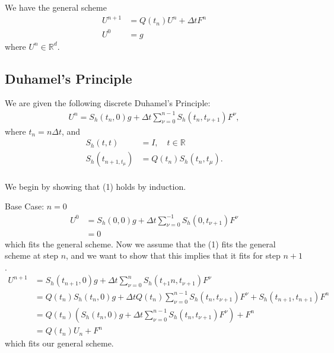 We have the general scheme 
\begin{align*}
U^{n+1}  &= Q(t_n) U^n + \Delta t F^n \\
U^0 &= g
\end{align*}
where $U^n \in \mathbb{R}^d$. 

\subsection{Duhamel’s Principle}
We are given the following discrete Duhamel’s Principle:
\begin{align}
U^n = S_h(t_n,0)g+\Delta t \sum_{\nu = 0}^{n-1} S_h(t_n , t_{\nu + 1}) F^{\nu} , 
\end{align}
where $t_n = n \Delta t$, and 
\begin{align*}
S_h(t,t) &= I, \quad t \in \mathbb{R} \\
S_h(t_{n+1,t_{\mu}}) &= Q(t_n)S_h(t_n,t_{\mu}).
\end{align*}
\\
We begin by showing that (1) holds by induction.

Base Case: $n = 0$
\begin{align*}
U^0 &= S_h(0,0)g+\Delta t \sum_{\nu = 0}^{-1} S_h(0 , t_{\nu + 1}) F^{\nu} \\
& = 0
\end{align*}
which fits the general scheme. 
Now we assume that the (1) fits the general scheme at step $n$, and we want to show that this implies that it fits for step $n+1$.
\begin{align*}
U^{n+1} &= S_h(t_{n+1},0)g+\Delta t \sum_{\nu = 0}^{n} S_h(t_{+1}n , t_{\nu + 1}) F^{\nu} \\
&= Q(t_n)S_h(t_n,0)g + \Delta t Q(t_n) \sum_{\nu = 0}^{n-1} S_h(t_n , t_{\nu + 1}) F^{\nu} + S_h(t_{n+1} , t_{n + 1}) F^{n} \\ &= Q(t_n)(S_h(t_n,0)g + \Delta t \sum_{\nu = 0}^{n-1} S_h(t_n , t_{\nu + 1}) F^{\nu})+F^{n} \\ 
&= Q(t_n)U_n+F^{n} %
\end{align*}
which fits our general scheme.
